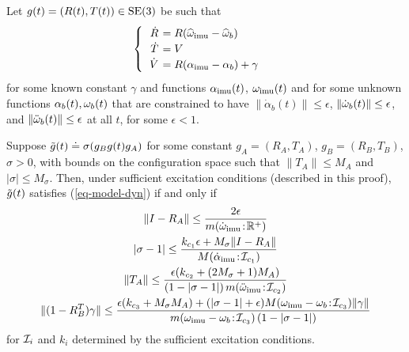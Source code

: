 \begin{claim}\label{claim-five}
Let $g(t)= (R(t), T(t)) \in \operatorname{SE}(3)$ be such that
\begin{equation}
\begin{cases}
\begin{tabular}{>{$}r<{$} >{$\!\!\!\!\!}l<{$}}
\dot R &= R(\hw\imu  - \hw_b) \\
\dot T &= V \\
\dot V &= R(\alpha\imu  - \alpha_b) + \gamma
\end{tabular}
\end{cases}
\label{eq-model-dyn}
\end{equation}
for some known constant $\gamma$ and functions $\alpha_\mathrm{imu} (t)$, $\omega_\mathrm{imu} (t)$ and for some unknown functions $\alpha_b(t), \omega_b(t)$ that are constrained to have $\| \dot \alpha_b(t) \| \le \epsilon$, $\| \dot {\omega}_b(t) \| \le \epsilon$, and $\|\ddot{\omega}_b(t)\|\le\epsilon$ at all $t$,
for some $\epsilon<1$.

Suppose $\tilde{g}(t) \doteq \sigma(g_B g(t) g_A)$ for some  constant $g_A = (R_A, T_A)$, $g_B = (R_B, T_B)$, $\sigma > 0$,
with bounds on the configuration space such that
$\|T_A\|\leq M_A$ and $|\sigma|\leq M_\sigma$.
Then, under sufficient excitation conditions (described in this proof), 
$\tilde{g}(t)$ satisfies  (\ref{eq-model-dyn}) if and only if 
\begin{gather}
\| I - R_A \|  \leq  \frac{2{\epsilon}}{\m(\dot{\w}\imu\!:\!{\RR^+})}  \label{constraint1}\\
|\sigma - 1|  \le \frac{k_{c_1}\epsilon + M_\sigma\|I-R_A\|}{\M(\dot\alpha\imu\!:\!{\I_{c_1}})} \label{constraint2}\\
\|T_A\|\leq \frac{\epsilon(k_{c_2}+(2M_\sigma+1)M_A)}{(1-|\sigma-1|)\,\m(\ddot\w\imu\!:\!{\I_{c_2}})}\label{constraint3} \\
\|(1-R_B^T)\gamma\|\leq\frac{\epsilon(k_{c_3} + M_\sigma M_A) + (|\sigma-1|+\epsilon)\M(\w\imu-\w_b\!:\!\I_{c_3})\|\gamma\|}
{\m(\w\imu-\w_b\!:\!\I_{c_3})\,(1-|\sigma-1|)}\label{constraint4}
\end{gather}
for $\mathcal{I}_i$ and $k_i$ determined by the sufficient excitation conditions.
\end{claim}
